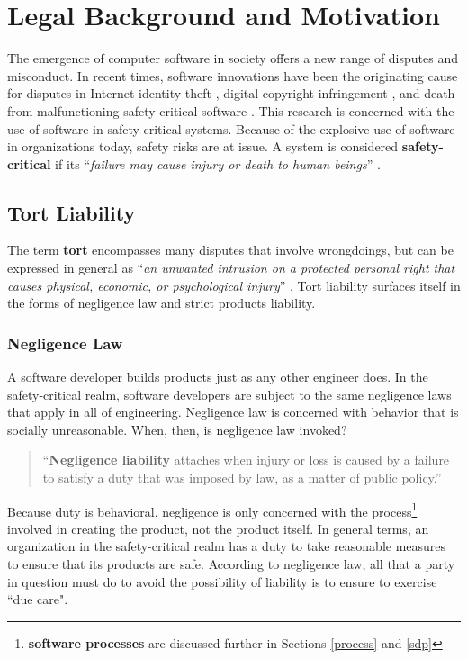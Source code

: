 \section{Legal Background and Motivation}
The emergence of computer software in society offers a new range of disputes and
misconduct. In recent times, software innovations have been the originating
cause for disputes in Internet identity theft \cite{Valetk2004}, digital
copyright infringement \cite{Manesh2006}, and death from malfunctioning
safety-critical software \cite{Leveson1993}. This research is concerned with the
use of software in safety-critical systems. Because of the explosive use of
software in organizations today, safety risks are at issue. A system is 
considered \textbf{safety-critical} if its ``\textit{failure may cause injury or
death to human beings}'' \cite{FOLDOC}.

\subsection{Tort Liability}
The term \textbf{tort} encompasses many disputes that involve wrongdoings, but 
can be expressed in general as ``\textit{an unwanted intrusion on a protected
personal right that causes physical, economic, or psychological injury}'' 
\cite{Burgunder2004}. Tort liability surfaces itself in the forms of negligence
law and strict products liability.

\subsubsection{Negligence Law}
A software developer builds products just as any other engineer does. In the
safety-critical realm, software developers are subject to the same negligence
laws that apply in all of engineering. Negligence law is concerned with behavior
that is socially unreasonable. When, then, is negligence law invoked?

\begin{quote}
``\textbf{Negligence liability} attaches when injury or loss is caused by a 
failure to satisfy a duty that was imposed by law, as a matter of public
policy.'' \cite{Kaner_neg_1995}
\end{quote}

Because duty is behavioral, negligence is only concerned with the
process\footnote{\textbf{software processes} are discussed further in
Sections \ref{process} and \ref{sdp}} involved in creating the product, not the
product itself. In general terms, an organization in the safety-critical realm
has a duty to take reasonable measures to ensure that its products are safe.
According to negligence law, all that a party in question must do to avoid the 
possibility of liability is to ensure to exercise ``due care".

